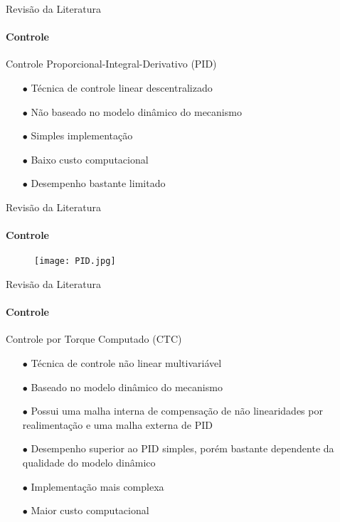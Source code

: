 \documentclass[25pt,landscape]{beamer}
\begin{document}
\begin{frame}{Revisão da Literatura}
    \framesubtitle{Controle}
    \begin{block}{Controle Proporcional-Integral-Derivativo (PID)}
        \begin{itemize}
            \item[$\bullet$] Técnica de controle linear descentralizado \\[8pt]
            \item[$\bullet$] Não baseado no modelo dinâmico do mecanismo \\[8pt]
            \item[$\bullet$] Simples implementação \\[8pt]
            \item[$\bullet$] Baixo custo computacional \\[8pt]
            \item[$\bullet$] Desempenho bastante limitado \\[8pt]
        \end{itemize}
    \end{block}
\end{frame}

\begin{frame}{Revisão da Literatura}
    \framesubtitle{Controle}
    \begin{figure}[!h]
        \centering
        \texttt{[image: PID.jpg]}
    \end{figure}  
\end{frame}

\begin{frame}{Revisão da Literatura}
    \framesubtitle{Controle}
    \begin{block}{Controle por Torque Computado (CTC)}
        \begin{itemize}
            \item[$\bullet$] Técnica de controle não linear multivariável \\[8pt]
            \item[$\bullet$] Baseado no modelo dinâmico do mecanismo \\[8pt]
            \item[$\bullet$] Possui uma malha interna de compensação de não linearidades por realimentação e uma malha externa de PID \\[8pt]
            \item[$\bullet$] Desempenho superior ao PID simples, porém bastante dependente da qualidade do modelo dinâmico \\[8pt]
            \item[$\bullet$] Implementação mais complexa \\[8pt]
            \item[$\bullet$] Maior custo computacional \\[8pt]
        \end{itemize}
    \end{block}
\end{frame}
\end{document}
